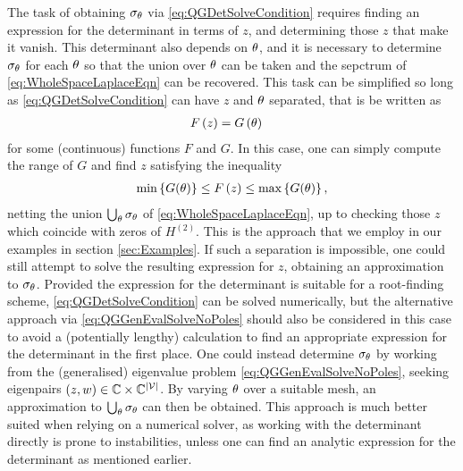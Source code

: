 The task of obtaining $\sigma_\theta$ via \eqref{eq:QGDetSolveCondition} requires finding an expression for the determinant in terms of $z$, and determining those $z$ that make it vanish.
This determinant also depends on $\theta$, and it is necessary to determine $\sigma_\theta$ for each $\theta$ so that the union over $\theta$ can be taken and the sepctrum of \eqref{eq:WholeSpaceLaplaceEqn} can be recovered.
This task can be simplified so long as \eqref{eq:QGDetSolveCondition} can have $z$ and $\theta$ separated, that is be written as
\begin{align*}
	F\left( z \right) &= G\left( \theta \right)
\end{align*}
for some (continuous) functions $F$ and $G$.
In this case, one can simply compute the range of $G$ and find $z$ satisfying the inequality
\begin{align*}
	\min\left\{ G(\theta) \right\} \leq F\left( z \right) \leq \max\left\{ G(\theta) \right\},
\end{align*}
netting the union $\bigcup_{\theta}\sigma_\theta$ of \eqref{eq:WholeSpaceLaplaceEqn}, up to checking those $z$ which coincide with zeros of $H^{(2)}$.
This is the approach that we employ in our examples in section \ref{sec:Examples}.
If such a separation is impossible, one could still attempt to solve the resulting expression for $z$, obtaining an approximation to $\sigma_\theta$.
Provided the expression for the determinant is suitable for a root-finding scheme, \eqref{eq:QGDetSolveCondition} can be solved numerically, but the alternative approach via \eqref{eq:QGGenEvalSolveNoPoles} should also be considered in this case to avoid a (potentially lengthy) calculation to find an appropriate expression for the determinant in the first place.
One could instead determine $\sigma_\theta$ by working from the (generalised) eigenvalue problem \eqref{eq:QGGenEvalSolveNoPoles}, seeking eigenpairs $\left( z, w \right)\in\mathbb{C}\times\mathbb{C}^{\left\lvert \mathcal{V} \right\rvert}$.
By varying $\theta$ over a suitable mesh, an approximation to $\bigcup_{\theta}\sigma_\theta$ can then be obtained.
This approach is much better suited when relying on a numerical solver, as working with the determinant directly is prone to instabilities, unless one can find an analytic expression for the determinant as mentioned earlier.

